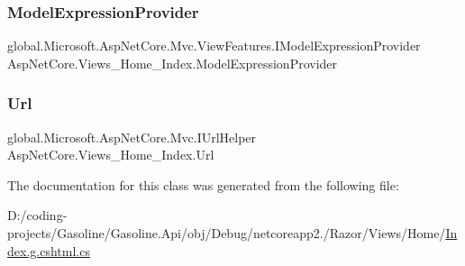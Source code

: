 \mbox{\label{class_asp_net_core_1_1_views___home___index_a1c12fddbab3a154a62b2a730eee55181}} 
\subsubsection{\texorpdfstring{ModelExpressionProvider}{ModelExpressionProvider}}
{\footnotesize\ttfamily global.\+Microsoft.\+Asp\+Net\+Core.\+Mvc.\+View\+Features.\+I\+Model\+Expression\+Provider Asp\+Net\+Core.\+Views\+\_\+\+Home\+\_\+\+Index.\+Model\+Expression\+Provider\hspace{0.3cm}{\ttfamily [get]}}

\mbox{\label{class_asp_net_core_1_1_views___home___index_a49920e11fc6a3866a9362b0760f02473}} 
\subsubsection{\texorpdfstring{Url}{Url}}
{\footnotesize\ttfamily global.\+Microsoft.\+Asp\+Net\+Core.\+Mvc.\+I\+Url\+Helper Asp\+Net\+Core.\+Views\+\_\+\+Home\+\_\+\+Index.\+Url\hspace{0.3cm}{\ttfamily [get]}}



The documentation for this class was generated from the following file\+:\begin{DoxyCompactItemize}
\item 
D\+:/coding-\/projects/\+Gasoline/\+Gasoline.\+Api/obj/\+Debug/netcoreapp2./\+Razor/\+Views/\+Home/\mbox{\hyperlink{_index_8g_8cshtml_8cs}{Index.\+g.\+cshtml.\+cs}}\end{DoxyCompactItemize}
